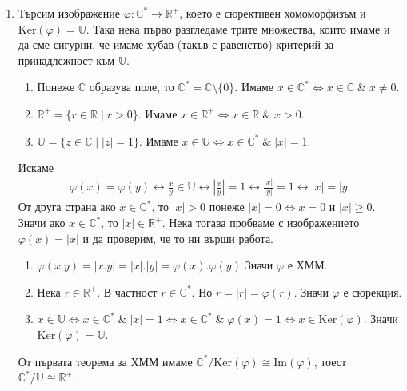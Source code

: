 \documentclass[12pt]{article}
\begin{document}
\begin{enumerate}[label=\alph*)]
    \item Търсим изображение \(\varphi : \mathbb{C}^* \to \mathbb{R}^+\),
    което е сюрективен хомоморфизъм и \(\mathrm{Ker}(\varphi) = \mathbb{U}\).
    Така нека първо разгледаме трите множества, които имаме и да сме сигурни, че имаме хубав (такъв с равенство) критерий за принадлежност към \(\mathbb{U}\).
    \begin{enumerate}[label=\arabic*.]
        \item Понеже \(\mathbb{C}\) образува поле, то \(\mathbb{C}^* = \mathbb{C} \setminus \{0\}\). Имаме \(x \in \mathbb{C}^* \iff x \in \mathbb{C} \; \& \; x \neq 0\).
        \item \(\mathbb{R}^+ = \{r \in \mathbb{R} \; | \; r > 0\}\). Имаме \(x \in \mathbb{R}^+ \iff x \in \mathbb{R} \; \& \; x > 0\).
        \item \(\mathbb{U} = \{z \in \mathbb{C} \; | \; |z| = 1\}\). Имаме 
        \(x \in \mathbb{U} \iff x \in \mathbb{C}^* \; \& \; |x| = 1\).
    \end{enumerate}
    Искаме \begin{align*}
        \varphi(x) = \varphi(y) \longleftrightarrow 
        \displaystyle\frac{x}{y} \in \mathbb{U} \longleftrightarrow 
        \left|\displaystyle\frac{x}{y}\right| = 1 \longleftrightarrow
        \displaystyle\frac{|x|}{|y|} = 1 \longleftrightarrow
        |x| = |y|
    \end{align*} 
    От друга страна ако \(x \in \mathbb{C}^*\), то \(|x| > 0\) понеже \(|x| = 0 \iff x = 0\) и \(|x| \geq 0\). Значи ако \(x \in \mathbb{C}^*\), то \(|x| \in \mathbb{R}^+\).
    Нека тогава пробваме с изображението \(\varphi(x) = |x|\) и да проверим, че то ни върши работа.
    \begin{enumerate}[label=\arabic*.]
        \item \(\varphi(x.y) = |x.y| = |x|.|y| = \varphi(x).\varphi(y)\) Значи  \(\varphi\) е ХММ.
        \item Нека \(r \in \mathbb{R}^+\). В частност \(r \in \mathbb{C}^*\).
        Но \(r = |r| = \varphi(r)\). Значи \(\varphi\) е сюрекция.
        \item \(x \in \mathbb{U} \iff x \in \mathbb{C}^* \; \& \; |x| = 1 \iff
        x \in \mathbb{C}^* \; \& \; \varphi(x) = 1 \iff x \in \mathrm{Ker}(\varphi)\).
        Значи \(\mathrm{Ker}(\varphi) = \mathbb{U}\).
    \end{enumerate}
    От първата теорема за ХММ имаме \(\mathbb{C}^* / \mathrm{Ker}(\varphi) \cong \mathrm{Im}(\varphi)\), тоест \(\mathbb{C}^* / \mathbb{U} \cong \mathbb{R}^+\).

\end{enumerate}
\end{document}
